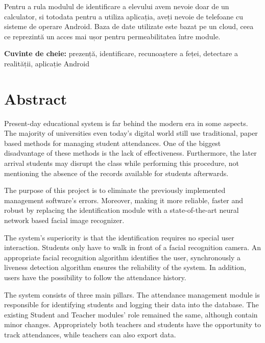 Pentru a rula modulul de identificare a elevului avem nevoie doar de un calculator, si totodata pentru a utiliza aplicația, aveți nevoie de telefoane cu sisteme de operare Android.
Baza de date utilizate este bazat pe un cloud, ceea ce reprezintă un acces mai ușor pentru permeabilitatea între module.


\vspace*{2cm}


\noindent \textbf{Cuvinte de cheie:} prezență, identificare, recunoaștere a feței, detectare a realității, aplicație Android

\vfill
{}

\chapter*{Abstract}

Present-day educational system is far behind the modern era in some aspects. The majority of universities even today’s digital world still use traditional, paper based methods for managing student attendances. One of the biggest disadvantage of these methods is the lack of effectiveness. Furthermore, the later arrival students may disrupt the class while performing this procedure, not mentioning the absence of the records available for students afterwards.

The purpose of this project is to eliminate the previously implemented management software’s errors. Moreover, making it more reliable, faster and robust by replacing the identification module with a state-of-the-art neural network based facial image recognizer.

The system’s superiority is that the identification requires no special user interaction. Students only have to walk in front of a facial recognition camera. An appropriate facial recognition algorithm identifies the user, synchronously a liveness detection algorithm ensures the reliability of the system. In addition, users have the possibility to follow the attendance history.

The system consists of three main pillars. The attendance management module is responsible for identifying students and logging their data into the database. The existing Student and Teacher modules’ role remained the same, although contain minor changes. Appropriately both teachers and students have the opportunity to track attendances, while teachers can also export data.

